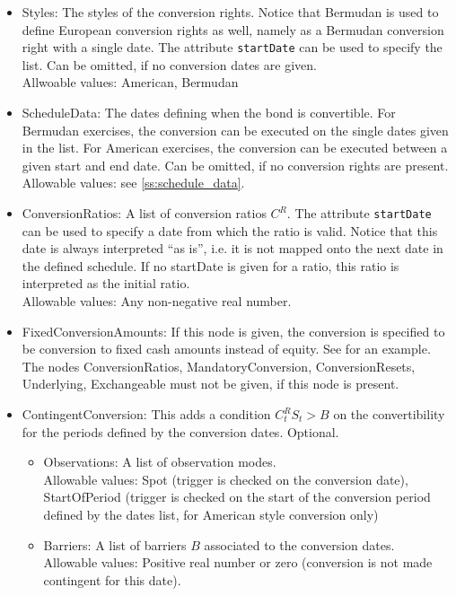 \begin{itemize}

\item Styles: The styles of the conversion rights. Notice that Bermudan is used to define European conversion rights as
  well, namely as a Bermudan conversion right with a single date. The attribute \verb+startDate+ can be used to
  specify the list. Can be omitted, if no conversion dates are given.\\
  Allwoable values: American, Bermudan

\item ScheduleData: The dates defining when the bond is convertible. For Bermudan exercises, the conversion can be
  executed on the single dates given in the list. For American exercises, the conversion can be executed between a given
  start and end date. Can be omitted, if no conversion rights are present.\\
  Allowable values: see \ref{ss:schedule_data}.

\item ConversionRatios: A list of conversion ratios $C^R$. The attribute \verb+startDate+ can be used to specify a date
  from which the ratio is valid. Notice that this date is always interpreted ``as is'', i.e. it is not mapped onto the
  next date in the defined schedule. If no startDate is given for a ratio, this ratio is interpreted as the initial
  ratio. \\
  Allowable values: Any non-negative real number.

\item FixedConversionAmounts: If this node is given, the conversion is specified to be conversion to fixed cash amounts
  instead of equity. See \label{lst:convertiblebonddata_conversion_6} for an example. The nodes ConversionRatios,
  MandatoryConversion, ConversionResets, Underlying, Exchangeable must not be given, if this node is present.

\item ContingentConversion: This adds a condition $C^R_t S_t > B$ on the convertibility for the periods defined by the
  conversion dates. Optional.
  \begin{itemize}
  \item Observations: A list of observation modes. \\
    Allowable values: Spot (trigger is checked on the conversion date), StartOfPeriod (trigger is checked on the start
    of the conversion period defined by the dates list, for American style conversion only)
  \item Barriers: A list of barriers $B$ associated to the conversion dates. \\
    Allowable values: Positive real number or zero (conversion is not made contingent for this date).
  \end{itemize}


\end{itemize}
